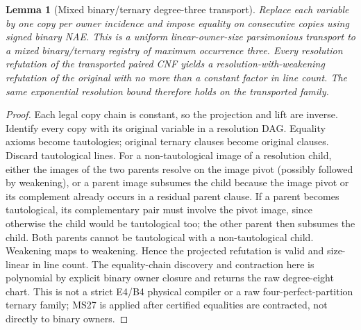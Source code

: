 \documentclass[11pt]{article}
\newtheorem{lemma}[theorem]{Lemma}
\begin{document}
\begin{lemma}[Mixed binary/ternary degree-three transport]\label{lem:rt26-split}
Replace each variable by one copy per owner incidence and impose equality on consecutive copies using signed binary NAE. This is a uniform linear-owner-size parsimonious transport to a mixed binary/ternary registry of maximum occurrence three. Every resolution refutation of the transported paired CNF yields a resolution-with-weakening refutation of the original with no more than a constant factor in line count. The same exponential resolution bound therefore holds on the transported family.
\end{lemma}
\begin{proof}
Each legal copy chain is constant, so the projection and lift are inverse. Identify every copy with its original variable in a resolution DAG. Equality axioms become tautologies; original ternary clauses become original clauses. Discard tautological lines. For a non-tautological image of a resolution child, either the images of the two parents resolve on the image pivot (possibly followed by weakening), or a parent image subsumes the child because the image pivot or its complement already occurs in a residual parent clause. If a parent becomes tautological, its complementary pair must involve the pivot image, since otherwise the child would be tautological too; the other parent then subsumes the child. Both parents cannot be tautological with a non-tautological child. Weakening maps to weakening. Hence the projected refutation is valid and size-linear in line count. The equality-chain discovery and contraction here is polynomial by explicit binary owner closure and returns the raw degree-eight chart. This is not a strict E4/B4 physical compiler or a raw four-perfect-partition ternary family; MS27 is applied after certified equalities are contracted, not directly to binary owners.
\end{proof}
\end{document}
